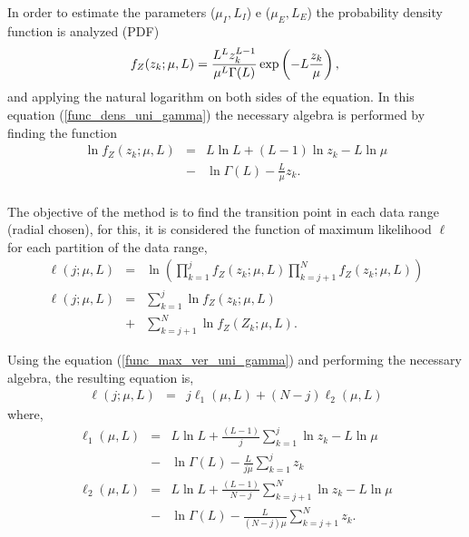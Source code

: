 \documentclass[conference]{IEEEtran}
\begin{document}
In order to estimate the parameters ($\mu_I,L_I$) e ($\mu_E,L_E$)  the probability density function is analyzed (PDF)
\begin{equation}\label{func_dens_uni_gamma}
	f_Z(z_k;\mu,L)=\frac{L^{L}z_k^{L-1}}{\mu^{L}\Gamma(L)} \exp\left(-L\frac{z_k}{\mu}\right), \\
\end{equation}
and applying the natural logarithm on both sides of the equation. In this equation (\ref{func_dens_uni_gamma}) the necessary algebra is performed by finding the function
\begin{equation}\label{func_max_ver_uni_gamma}
\begin{array}{lcl}
	\ln f_Z(z_k;\mu,L)&=& L\ln L +(L - 1) \ln z_k-L \ln \mu \\
	 	                  &-& \ln \Gamma(L) -\frac{L}{\mu} z_k.\\
\end{array}
\end{equation}

The objective of the method is to find the transition point in each data range (radial chosen), for this, it is considered the function of maximum likelihood $\ell$ for each partition of the data range, 
\begin{equation}\label{cap_acf_16}
\begin{array}{lcl}
 \ell(j;\mu, L)&=&\ln\left(\prod_{k=1}^{j}f_{Z}(z_k;\mu,L)\prod_{k=j+1}^{N}f_{Z}(z_k;\mu,L)\right)\\
 \ell(j;\mu, L)&=&\sum_{k=1}^{j}\ln f_{Z}(z_k;\mu,L)\\
             &+&\sum_{k=j+1}^{N}\ln f_{Z}(Z_k;\mu,L).
 \end{array}
 \end{equation}
 
Using the equation (\ref{func_max_ver_uni_gamma}) and performing the necessary algebra, the resulting equation is, 
\begin{equation}\nonumber
\begin{array}{ccc}\label{func_l_param}  
  \ell(j;\mu, L)&=&j\ell_1(\mu, L) + (N - j)\ell_2(\mu, L)
 \end{array}
 \end{equation}
where,
 \begin{equation}
\begin{array}{lcl}\label{func_l_param_1_2}
    \ell_1(\mu, L)&=&L\ln L+\frac{(L-1)}{j}\sum_{k=1}^{j}\ln z_k-L\ln\mu\\
    &-&\ln\Gamma(L) -\frac{L}{j\mu}\sum_{k=1}^{j} z_k\\
    \ell_2(\mu, L)&=&L\ln L+\frac{(L-1)}{N-j}\sum_{k=j+1}^{N}\ln z_k-L\ln\mu\\
    &-&\ln\Gamma(L) -\frac{L}{(N-j)\mu}\sum_{k=j+1}^{N} z_k.
 \end{array}
 \end{equation}
 
\end{document}
